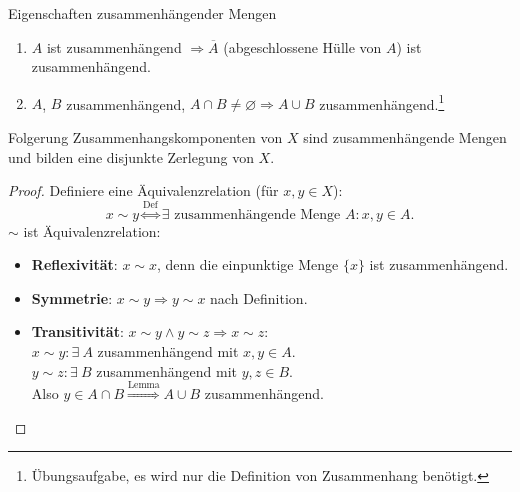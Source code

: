 \begin{lemma}{Eigenschaften zusammenhängender Mengen}
  \begin{enumerate}
    \item $ A $ ist zusammenhängend $ \Rightarrow \overline{A} $ (abgeschlossene Hülle von $ A $) ist zusammenhängend.
    \item $ A $, $ B $ zusammenhängend, $ A \cap B \neq \varnothing \Rightarrow A \cup B $ zusammenhängend.\footnote{Übungsaufgabe, es wird nur die Definition von Zusammenhang benötigt.} 
  \end{enumerate}
\end{lemma}

\begin{remark}{Folgerung}
  Zusammenhangskomponenten von $ X $ sind zusammenhängende Mengen und bilden eine disjunkte Zerlegung von $ X $.
  \begin{proof}
    Definiere eine Äquivalenzrelation (für $ x, y \in X $):
    \begin{equation*}
      x \sim y \overset{\text{Def}}{\Leftrightarrow} \exists \text{ zusammenhängende Menge } A : x, y \in A\text{.}
    \end{equation*}
    $ \sim $ ist Äquivalenzrelation:
    \begin{itemize}
      \item \textbf{Reflexivität}: $ x \sim x $, denn die einpunktige Menge $ \{ x \} $ ist zusammenhängend. 
      \item \textbf{Symmetrie}: $ x \sim y \Rightarrow y \sim x $ nach Definition.
      \item \textbf{Transitivität}: $ x \sim y \wedge y \sim z \Rightarrow x \sim z $: \\
        $ x \sim y: \exists \ A $ zusammenhängend mit $ x,y \in A $. \\
        $ y \sim z: \exists \ B $ zusammenhängend mit $ y,z \in B $. \\
        Also $ y \in A \cap B \overset{\text{Lemma}}{\Rightarrow} A \cup B $ zusammenhängend.
    \end{itemize}
  \end{proof}
\end{remark}

